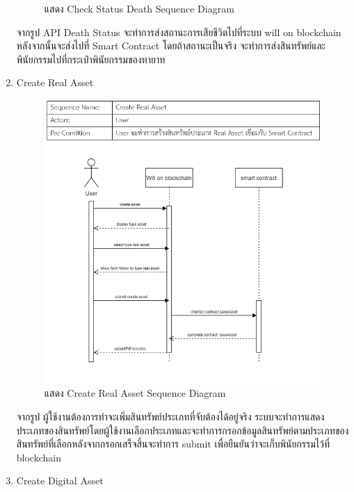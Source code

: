 \documentclass[12pt,oneside,openright,a4paper]{cpe-thai-project}
\begin{document}
\begin{enumerate}[label=\thesubsection.\arabic*,leftmargin=0pt,itemindent=2.5cm]
\begin{figure}[!thb]
			\caption{แสดง Check Status Death Sequence Diagram}
		\end{figure}
		\FloatBarrier
	\tab จากรูป API Death Status จะทำการส่งสถานะการเสียชีวิตไปที่ระบบ will on blockchain หลังจากนั้นจะส่งไปที่ Smart Contract โดยถ้าสถานะเป็นจริง จะทำการส่งสินทรัพย์และพินัยกรรมไปที่กระเป๋าพินัยกรรมของทายาท
	\item Create Real Asset
		\begin{figure}[!thb]
			\centering
			\includegraphics[scale=0.6]{createRealAssetseq}
			\caption{แสดง Create Real Asset Sequence Diagram}
		\end{figure}
		\FloatBarrier
	\tab จากรูป ผู้ใช้งานต้องการทำจะเพิ่มสินทรัพย์ประเภทที่จับต้องได้อยู่จริง ระบบจะทำการแสดงประเภทของสินทรัพย์โดยผู้ใช้งานเลือกประเภทและจะทำการกรอกข้อมูลสินทรัพย์ตามประเภทของสินทรัพย์ที่เลือกหลังจากกรอกเสร็จสิ้นจะทำการ submit เพื่อยืนยันว่าจะเก็บพินัยกรรมไว้ที่ blockchain
	\item Create Digital Asset
		\begin{figure}[!thb]
			\centering

\end{figure}
\end{enumerate}
\end{document}
